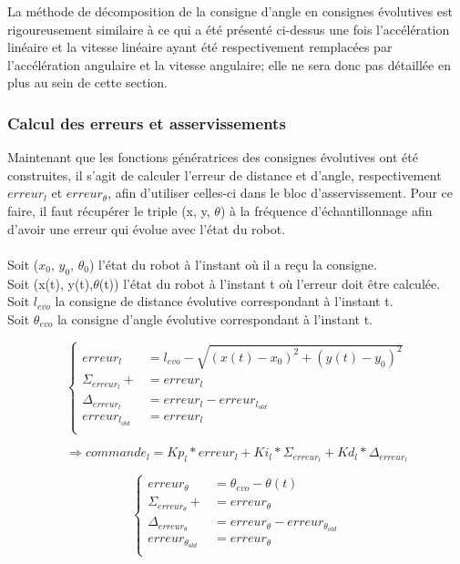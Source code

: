 \documentclass[a4paper,11pt]{article}
\begin{document}
La méthode de décomposition de la consigne d'angle en consignes évolutives est rigoureusement similaire à ce qui a été présenté ci-dessus une fois l'accélération linéaire et la vitesse linéaire ayant été respectivement remplacées par l'accélération angulaire et la vitesse angulaire; elle ne sera donc pas détaillée en plus au sein de cette section.

\subsubsection{Calcul des erreurs et asservissements}
Maintenant que les fonctions génératrices des consignes évolutives ont été construites, il s'agit de calculer l'erreur de distance et d'angle, respectivement $erreur_{l}$ et $erreur_{\theta}$, afin d'utiliser celles-ci dans le bloc d'asservissement. Pour ce faire, il faut récupérer le triple (x, y, $\theta$) à la fréquence d'échantillonnage afin d'avoir une erreur qui évolue avec l'état du robot.\\\\
Soit ($x_{0}$, $y_{0}$, $\theta_{0}$) l'état du robot à l'instant où il a reçu la consigne.\\
Soit (x(t), y(t),$\theta$(t)) l'état du robot à l'instant t où l'erreur doit être calculée.\\
Soit $l_{evo}$ la consigne de distance évolutive correspondant à l'instant t.\\
Soit $\theta_{evo}$ la consigne d'angle évolutive correspondant à l'instant t.

\begin{equation*}
    \left\{
        \begin{aligned}
            erreur_{l} & = l_{evo} - \sqrt{(x(t)-x_{0})^2+(y(t)-y_{0})^2}\\
            \Sigma_{erreur_{l}} +&= erreur_{l}\\
            \Delta_{erreur_{l}} & = erreur_{l} - erreur_{l_{old}}\\
            erreur_{l_{old}} & = erreur_{l}\\
            \end{aligned}
    \right.
\end{equation*}

\begin{equation*}
    \Rightarrow commande_{l} =  Kp_{l}*erreur_{l}+Ki_{l}*\Sigma_{erreur_{l}}+Kd_{l}*\Delta_{erreur_{l}}
\end{equation*}

\begin{equation*}
    \left\{
        \begin{aligned}
            erreur_{\theta} & = \theta_{evo} - \theta(t)\\
            \Sigma_{erreur_{\theta}} +&= erreur_{\theta}\\
            \Delta_{erreur_{\theta}} & = erreur_{\theta} - erreur_{\theta_{old}}\\
            erreur_{\theta_{old}} & = erreur_{\theta}\\
        \end{aligned}
    \right.
\end{equation*}
\end{document}
